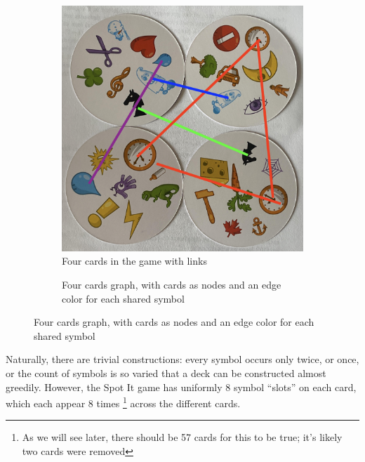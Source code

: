 \documentclass[11pt, oneside]{article} 	%
\begin{document}
\begin{figure}[!htb]
\begin{subfigure}{.2\textwidth}
\includegraphics[scale=.2]{cards-links}
\caption{Four cards in the game with links}
\label{fig:cards-links}
\end{subfigure}

\begin{subfigure}{.2\textwidth}
\caption{Four cards graph, with cards as nodes and an edge color for each shared symbol}
\label{fig:cards-graph}
\end{subfigure}

\end{figure}

Naturally, there are trivial constructions: every symbol occurs only twice, or once, or the count of symbols is so varied that a deck can be constructed almost greedily. However, the Spot It game has uniformly 8 symbol ``slots'' on each card, which each appear 8 times \footnote{As we will see later, there should be 57 cards for this to be true; it's likely two cards were removed} across the different cards. 
\end{document}
